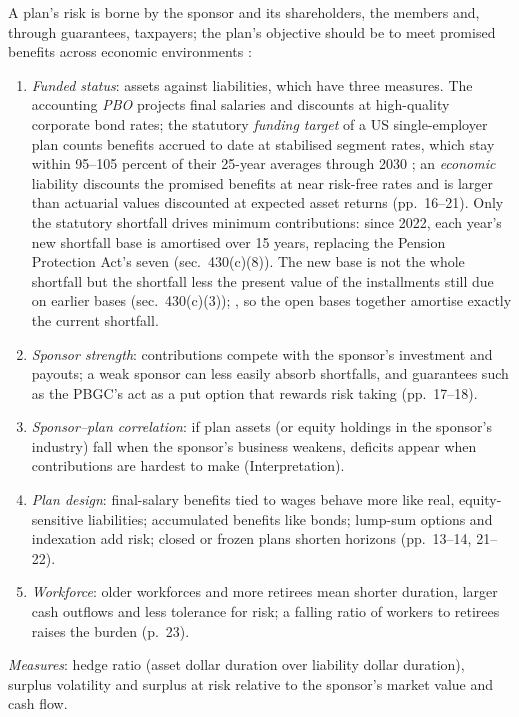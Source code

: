 \begin{qfmethod}\label{meth:db-pension-risk}
 A plan's risk is borne by the sponsor and its shareholders, the members and, through guarantees, taxpayers; the plan's objective should be to meet promised benefits across economic environments \citep[chap.~1, pp.~16--22]{s7-ang}:
\begin{enumerate}
\item \emph{Funded status}: assets against liabilities, which have three measures. The accounting \emph{PBO} projects final salaries and discounts at high-quality corporate bond rates; the statutory \emph{funding target} of a US single-employer plan counts benefits accrued to date at stabilised segment rates, which stay within 95--105 percent of their 25-year averages through 2030 \citep[sec.~430(d)(1), (h)(2)(C)(iv)]{us-internal-revenue-code-26}; an \emph{economic} liability discounts the promised benefits at near risk-free rates and is larger than actuarial values discounted at expected asset returns (pp.~16--21). Only the statutory shortfall drives minimum contributions: since 2022, each year's new shortfall base is amortised over 15 years, replacing the Pension Protection Act's seven (sec.~430(c)(8)). The new base is not the whole shortfall but the shortfall less the present value of the installments still due on earlier bases (sec.~430(c)(3)); \citep[sec.~III.B.1]{irs-notice-2021-48}, so the open bases together amortise exactly the current shortfall.
\item \emph{Sponsor strength}: contributions compete with the sponsor's investment and payouts; a weak sponsor can less easily absorb shortfalls, and guarantees such as the PBGC's act as a put option that rewards risk taking (pp.~17--18).
\item \emph{Sponsor--plan correlation}: if plan assets (or equity holdings in the sponsor's industry) fall when the sponsor's business weakens, deficits appear when contributions are hardest to make (Interpretation).
\item \emph{Plan design}: final-salary benefits tied to wages behave more like real, equity-sensitive liabilities; accumulated benefits like bonds; lump-sum options and indexation add risk; closed or frozen plans shorten horizons (pp.~13--14, 21--22).
\item \emph{Workforce}: older workforces and more retirees mean shorter duration, larger cash outflows and less tolerance for risk; a falling ratio of workers to retirees raises the burden (p.~23).
\end{enumerate}
\emph{Measures}: hedge ratio (asset dollar duration over liability dollar duration), surplus volatility and surplus at risk relative to the sponsor's market value and cash flow.


\end{qfmethod}
